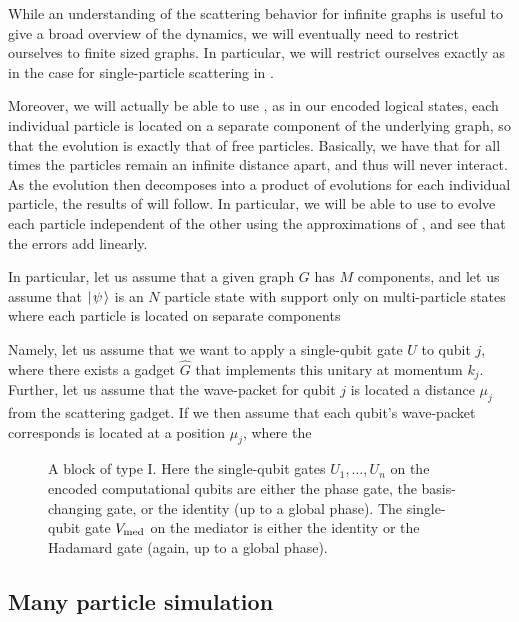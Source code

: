 \documentclass[../thesis-main/thesis-main]{subfiles}
\begin{document}
While an understanding of the scattering behavior for infinite graphs is useful to give a broad overview of the dynamics, we will eventually need to restrict ourselves to finite sized graphs.  In particular, we will restrict ourselves exactly as in the case for single-particle scattering in .

Moreover, we will actually be able to use , as in our encoded logical states, each individual particle is located on a separate component of the underlying graph, so that the evolution is exactly that of free particles.  Basically, we have that for all times the particles remain an infinite distance apart, and thus will never interact.  As the evolution then decomposes into a product of evolutions for each individual particle, the results of  will follow.  In particular, we will be able to use  to evolve each particle independent of the other using the approximations of , and see that the errors add linearly.

In particular, let us assume that a given graph $G$ has $M$ components, and let us assume that $|\mspace{2mu} \psi \mspace{2mu} \rangle$ is an $N$ particle state with support only on multi-particle states where each particle is located on separate components

Namely, let us assume that we want to apply a single-qubit gate $U$ to qubit $j$, where there exists a gadget $\widehat{G}$ that implements this unitary at momentum $k_j$.  Further, let us assume that the wave-packet for qubit $j$ is located a distance $\mu_j$ from the scattering gadget.  If we then assume that each qubit's wave-packet corresponds is located at a position $\mu_j$, where the 


\begin{figure}
  \centering  
  
  \caption{A block of type I. Here the single-qubit gates $U_1,\ldots,U_n$ on the encoded computational qubits are either the phase gate, the basis-changing gate, or the identity (up to a global phase). The single-qubit gate $V_{\text{med}}$ on the mediator is either the identity or the Hadamard gate (again, up to a global phase).}
\label{fig:MP_u_sqf}
\end{figure}

\subsection{Many particle simulation}
\end{document}
